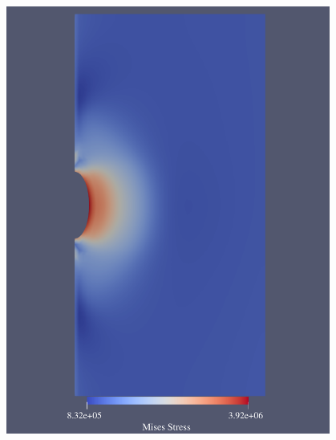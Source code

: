 \begin{figure}[ht!]
{\begin{minipage}{7cm}
            \includegraphics[width=0.95\textwidth]{img/chap5/应力/gk3mises.pdf}
        \end{minipage}
    } 
\end{figure}
